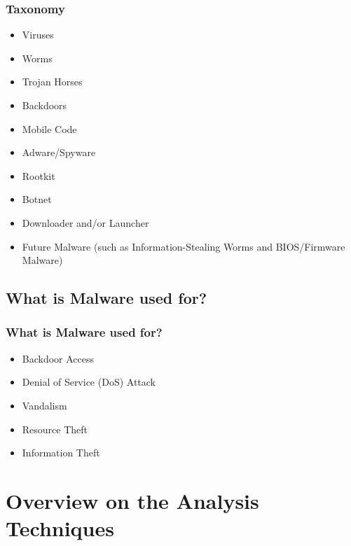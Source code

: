 \documentclass[]{beamer}
\begin{document}
		\begin{frame}
  			\frametitle{Taxonomy}
			
			\begin{itemize}
				\item {Viruses}
				\item {Worms}
				\item {Trojan Horses}
				\item {Backdoors}
				\item {Mobile Code}
				\item {Adware/Spyware}
				\item {Rootkit}
				\item {Botnet}
				\item {Downloader and/or Launcher}
				\item {Future Malware (such as Information-Stealing Worms and BIOS/Firmware Malware)}
			\end{itemize}
		\end{frame}
	
	\subsection {What is Malware used for?}

		\begin{frame}
  			\frametitle{What is Malware used for?}
			
			\begin{itemize}
				\item {Backdoor Access}
				\item {Denial of Service (DoS) Attack}
				\item {Vandalism}
				\item {Resource Theft}
				\item {Information Theft}
			\end{itemize}
		\end{frame}

\section {Overview on the Analysis Techniques }
\end{document}
